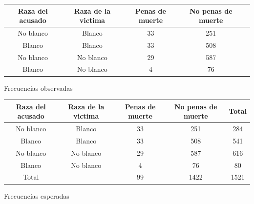 \documentclass{article}
\begin{document}
\begin{table}[ht]
    \centering
    \begin{tabular}{|c|c|c|c|c|}
        \hline
        Raza del acusado & Raza de la victima & Penas de muerte & No penas de muerte \\
        \hline
        No blanco        & Blanco             & 33              & 251                \\
        Blanco           & Blanco             & 33              & 508                \\
        No blanco        & No blanco          & 29              & 587                \\
        Blanco           & No blanco          & 4               & 76                 \\
        \hline
    \end{tabular}
\end{table}

Frecuencias observadas
\begin{table}[ht]
    \centering
    \begin{tabular}{|c|c|c|c|c|}
        \hline
        Raza del acusado & Raza de la victima & Penas de muerte & No penas de muerte & Total \\
        \hline
        No blanco        & Blanco             & 33              & 251                & 284   \\
        Blanco           & Blanco             & 33              & 508                & 541   \\
        No blanco        & No blanco          & 29              & 587                & 616   \\
        Blanco           & No blanco          & 4               & 76                 & 80    \\
        \hline
        Total            &                    & 99              & 1422               & 1521  \\
        \hline
    \end{tabular}
\end{table}

Frecuencias esperadas
\end{document}
